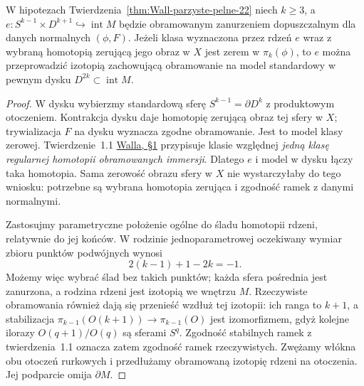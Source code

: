 \begin{lemat}
\label{lem:wall-zero-do-dysku-22}
W hipotezach Twierdzenia~\ref{thm:Wall-parzyste-pelne-22}
niech $k\geq3$, a
$e:S^{k-1}\times D^{k+1}\hookrightarrow\operatorname{int}M$
będzie obramowanym zanurzeniem dopuszczalnym dla
danych normalnych $(\phi,F)$. Jeżeli klasa
wyznaczona przez rdzeń $e$ wraz z wybraną
homotopią zerującą jego obraz w $X$ jest zerem
w $\pi_k(\phi)$, to $e$ można przeprowadzić
izotopią zachowującą obramowanie na model
standardowy w pewnym dysku
$D^{2k}\subset\operatorname{int}M$.
\end{lemat}
\begin{proof}
W dysku wybierzmy standardową sferę
$S^{k-1}=\partial D^k$ z produktowym otoczeniem.
Kontrakcja dysku daje homotopię zerującą
obraz tej sfery w $X$; trywializacja $F$
na dysku wyznacza zgodne obramowanie.
Jest to model klasy zerowej.
Twierdzenie~1.1
\href{https://www.maths.ed.ac.uk/~v1ranick/books/scm.pdf}
{Walla, §1} przypisuje klasie względnej
\emph{jedną klasę regularnej homotopii
obramowanych immersji}. Dlatego $e$ i model
w dysku łączy taka homotopia. Sama zerowość
obrazu sfery w $X$ nie wystarczyłaby do
tego wniosku: potrzebne są wybrana homotopia
zerująca i zgodność ramek z danymi normalnymi.

Zastosujmy parametryczne położenie ogólne
do śladu homotopii rdzeni, relatywnie do
jej końców. W rodzinie jednoparametrowej
oczekiwany wymiar zbioru punktów podwójnych
wynosi
\[
 2(k-1)+1-2k=-1.
\]
Możemy więc wybrać ślad bez takich punktów;
każda sfera pośrednia jest zanurzona, a rodzina
rdzeni jest izotopią we wnętrzu $M$.
Rzeczywiste obramowania również dają się
przenieść wzdłuż tej izotopii: ich ranga to
$k+1$, a stabilizacja
$\pi_{k-1}(O(k+1))\to\pi_{k-1}(O)$
jest izomorfizmem, gdyż kolejne ilorazy
$O(q+1)/O(q)$ są sferami $S^q$.
Zgodność stabilnych ramek z twierdzenia~1.1
oznacza zatem zgodność ramek rzeczywistych.
Zwężamy włókna obu otoczeń rurkowych i
przedłużamy obramowaną izotopię rdzeni
na otoczenia. Jej podparcie omija $\partial M$.
\end{proof}

